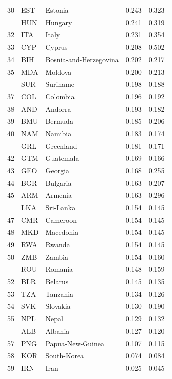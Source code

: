 \begin{table}
\begin{tabular}[t]{rllrr}
30 & EST & Estonia & 0.243 & 0.323\\
\addlinespace
31 & HUN & Hungary & 0.241 & 0.319\\
32 & ITA & Italy & 0.231 & 0.354\\
33 & CYP & Cyprus & 0.208 & 0.502\\
34 & BIH & Bosnia-and-Herzegovina & 0.202 & 0.217\\
35 & MDA & Moldova & 0.200 & 0.213\\
\addlinespace
36 & SUR & Suriname & 0.198 & 0.188\\
37 & COL & Colombia & 0.196 & 0.192\\
38 & AND & Andorra & 0.193 & 0.182\\
39 & BMU & Bermuda & 0.185 & 0.206\\
40 & NAM & Namibia & 0.183 & 0.174\\
\addlinespace
41 & GRL & Greenland & 0.181 & 0.171\\
42 & GTM & Guatemala & 0.169 & 0.166\\
43 & GEO & Georgia & 0.168 & 0.255\\
44 & BGR & Bulgaria & 0.163 & 0.207\\
45 & ARM & Armenia & 0.163 & 0.296\\
\addlinespace
46 & LKA & Sri-Lanka & 0.154 & 0.145\\
47 & CMR & Cameroon & 0.154 & 0.145\\
48 & MKD & Macedonia & 0.154 & 0.145\\
49 & RWA & Rwanda & 0.154 & 0.145\\
50 & ZMB & Zambia & 0.154 & 0.160\\
\addlinespace
51 & ROU & Romania & 0.148 & 0.159\\
52 & BLR & Belarus & 0.145 & 0.135\\
53 & TZA & Tanzania & 0.134 & 0.126\\
54 & SVK & Slovakia & 0.130 & 0.190\\
55 & NPL & Nepal & 0.129 & 0.132\\
\addlinespace
56 & ALB & Albania & 0.127 & 0.120\\
57 & PNG & Papua-New-Guinea & 0.107 & 0.115\\
58 & KOR & South-Korea & 0.074 & 0.084\\
59 & IRN & Iran & 0.025 & 0.045\\
\bottomrule
\end{tabular}
\end{table}